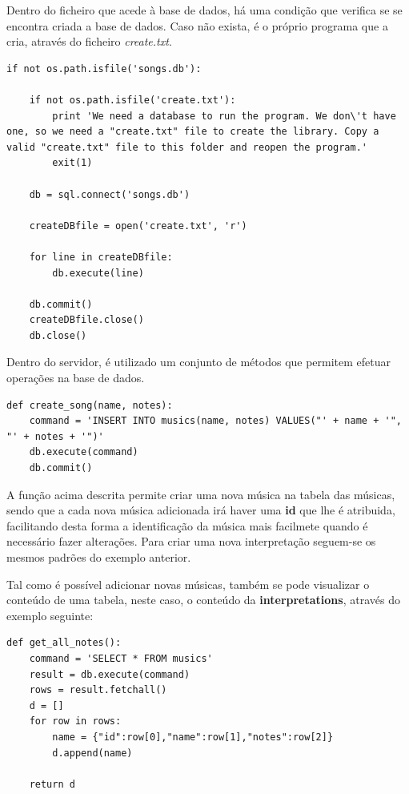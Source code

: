 Dentro do ficheiro que acede à base de dados, há uma condição que verifica se se encontra criada a base de dados. Caso não exista, é o próprio programa que a cria, através do ficheiro \emph{create.txt}.

\begin{lstlisting}
if not os.path.isfile('songs.db'):
	
	if not os.path.isfile('create.txt'):
		print 'We need a database to run the program. We don\'t have one, so we need a "create.txt" file to create the library. Copy a valid "create.txt" file to this folder and reopen the program.'
		exit(1)
		
	db = sql.connect('songs.db')
	
	createDBfile = open('create.txt', 'r')
	
	for line in createDBfile:
		db.execute(line)	
	
	db.commit()
	createDBfile.close()
	db.close()
\end{lstlisting}

Dentro do servidor, é utilizado um conjunto de métodos que permitem efetuar operações na base de dados.

\vspace{5mm}
\begin{lstlisting}
def create_song(name, notes):
	command = 'INSERT INTO musics(name, notes) VALUES("' + name + '", "' + notes + '")'
	db.execute(command)
	db.commit()
\end{lstlisting}
\vspace{5mm}

A função acima descrita permite criar uma nova música na tabela das músicas, sendo que a cada nova música adicionada irá haver uma \textbf{id} que lhe é atribuida, facilitando desta forma a identificação da música mais facilmete quando é necessário fazer alterações. Para criar uma nova interpretação seguem-se os mesmos padrões do exemplo anterior.

Tal como é possível adicionar novas músicas, também se pode visualizar o conteúdo de uma tabela, neste caso, o conteúdo da \textbf{interpretations}, através do exemplo seguinte:

\begin{lstlisting}
def get_all_notes():
	command = 'SELECT * FROM musics'
	result = db.execute(command)
	rows = result.fetchall()
	d = []
	for row in rows:
		name = {"id":row[0],"name":row[1],"notes":row[2]}
		d.append(name)

	return d
\end{lstlisting}

